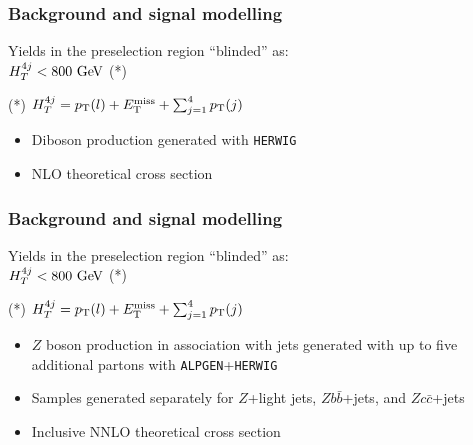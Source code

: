 \begin{frame}\frametitle{Background and signal modelling}
\centering\myskip

\begin{minipage}{.5\textwidth}\footnotesize\centering
\scriptsize
Yields in the preselection region ``blinded'' as:\\
$\htfj<800\gev$ (*)
\myskip

  

\myskip
(*) $\htfj = \pT(l) + \met + \sum_{j = 1}^{\rm 4}\pT(j)$
\end{minipage}\begin{minipage}{.5\textwidth}\footnotesize\centering

\begin{itemize}
\item Diboson production generated with {\tt HERWIG}
\item NLO theoretical cross section
\end{itemize}

\end{minipage}



\end{frame}


\begin{frame}\frametitle{Background and signal modelling}
\centering\myskip

\begin{minipage}{.5\textwidth}\footnotesize\centering
\scriptsize
Yields in the preselection region ``blinded'' as:\\
$\htfj<800\gev$ (*)
\myskip

  

\myskip
(*) $\htfj = \pT(l) + \met + \sum_{j = 1}^{\rm 4}\pT(j)$
\end{minipage}\begin{minipage}{.5\textwidth}\footnotesize\centering

\begin{itemize}
\item $Z$ boson production in association with jets generated with up to five additional partons with {\tt ALPGEN}+{\tt HERWIG}
\item Samples generated separately for $Z$+light jets, $Zb\bar{b}$+jets, and $Zc\bar{c}$+jets 
\item Inclusive NNLO theoretical cross section
\end{itemize}

\end{minipage}



\end{frame}


